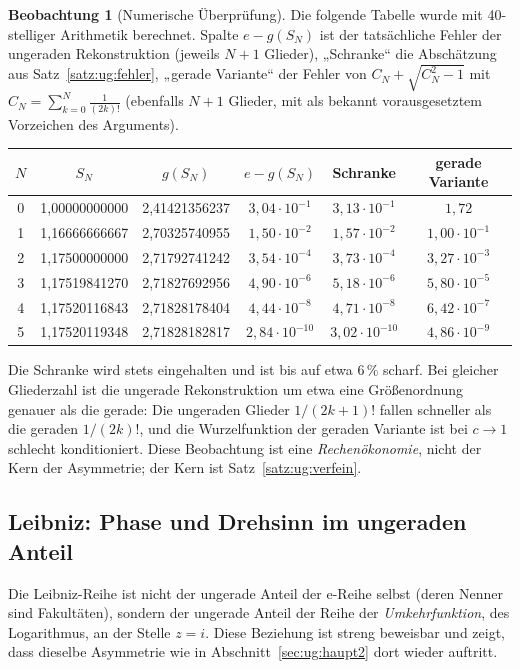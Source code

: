 \documentclass[a4paper,12pt,twoside]{report}
\theoremstyle{definition}
\newtheorem{beobachtung}{Beobachtung}
\begin{document}
\begin{beobachtung}[Numerische Überprüfung]\label{beob:ug:tab}
Die folgende Tabelle wurde mit 40-stelliger Arithmetik berechnet. Spalte $e-g(S_N)$ ist der tatsächliche Fehler der ungeraden Rekonstruktion (jeweils $N+1$ Glieder), „Schranke“ die Abschätzung aus Satz~\ref{satz:ug:fehler}, „gerade Variante“ der Fehler von $C_N+\sqrt{C_N^2-1}$ mit $C_N=\sum_{k=0}^N\frac1{(2k)!}$ (ebenfalls $N+1$ Glieder, mit als bekannt vorausgesetztem Vorzeichen des Arguments).
\begin{center}
\small
\begin{tabular}{c c c c c c}
$N$ & $S_N$ & $g(S_N)$ & $e-g(S_N)$ & Schranke & gerade Variante\\\hline
0 & 1{,}00000000000 & 2{,}41421356237 & $3{,}04\cdot10^{-1}$ & $3{,}13\cdot10^{-1}$ & $1{,}72$\\
1 & 1{,}16666666667 & 2{,}70325740955 & $1{,}50\cdot10^{-2}$ & $1{,}57\cdot10^{-2}$ & $1{,}00\cdot10^{-1}$\\
2 & 1{,}17500000000 & 2{,}71792741242 & $3{,}54\cdot10^{-4}$ & $3{,}73\cdot10^{-4}$ & $3{,}27\cdot10^{-3}$\\
3 & 1{,}17519841270 & 2{,}71827692956 & $4{,}90\cdot10^{-6}$ & $5{,}18\cdot10^{-6}$ & $5{,}80\cdot10^{-5}$\\
4 & 1{,}17520116843 & 2{,}71828178404 & $4{,}44\cdot10^{-8}$ & $4{,}71\cdot10^{-8}$ & $6{,}42\cdot10^{-7}$\\
5 & 1{,}17520119348 & 2{,}71828182817 & $2{,}84\cdot10^{-10}$ & $3{,}02\cdot10^{-10}$ & $4{,}86\cdot10^{-9}$\\
\end{tabular}
\end{center}
Die Schranke wird stets eingehalten und ist bis auf etwa $6\,\%$ scharf. Bei gleicher Gliederzahl ist die ungerade Rekonstruktion um etwa eine Größenordnung genauer als die gerade: Die ungeraden Glieder $1/(2k+1)!$ fallen schneller als die geraden $1/(2k)!$, und die Wurzelfunktion der geraden Variante ist bei $c\to1$ schlecht konditioniert. Diese Beobachtung ist eine \emph{Rechenökonomie}, nicht der Kern der Asymmetrie; der Kern ist Satz~\ref{satz:ug:verfein}.
\end{beobachtung}

\subsection{Leibniz: Phase und Drehsinn im ungeraden Anteil}
\label{sec:ug:leibniz}

Die Leibniz-Reihe ist nicht der ungerade Anteil der e-Reihe selbst (deren Nenner sind Fakultäten), sondern der ungerade Anteil der Reihe der \emph{Umkehrfunktion}, des Logarithmus, an der Stelle $z=i$. Diese Beziehung ist streng beweisbar und zeigt, dass dieselbe Asymmetrie wie in Abschnitt~\ref{sec:ug:haupt2} dort wieder auftritt.
\end{document}
